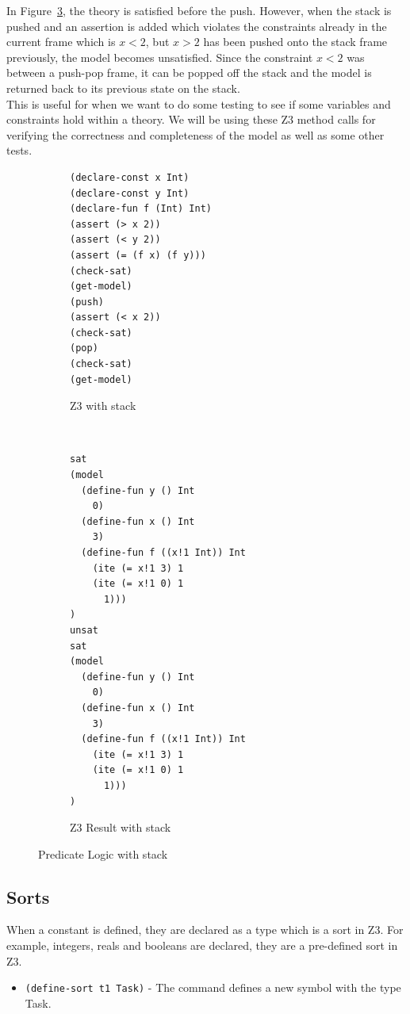 \documentclass[a4paper]{report}
\begin{document}
In Figure~\ref{fig:Predicate Logic with stack}, the theory is satisfied before the push. However, when the stack is pushed and an assertion is added which violates the constraints already in the current frame which is $x < 2$, but $x > 2$ has been pushed onto the stack frame previously, the model becomes unsatisfied. Since the constraint $x < 2$ was between a push-pop frame, it can be popped off the stack and the model is returned back to its previous state on the stack.\\

This is useful for when we want to do some testing to see if some variables and constraints hold within a theory. We will be using these Z3 method calls for verifying the correctness and completeness of the model as well as some other tests.

\begin{figure}[H]
\centering
\begin{subfigure}[b]{\textwidth}
\lstset{numbers=left, showspaces=false,
    showstringspaces=false, tabsize=2, breaklines=true,
    xleftmargin=5.0ex,
}
\lstset{basicstyle=\ttfamily}
\centering
\begin{lstlisting}[frame=single]
(declare-const x Int)
(declare-const y Int)
(declare-fun f (Int) Int)
(assert (> x 2))
(assert (< y 2))
(assert (= (f x) (f y)))
(check-sat)
(get-model)
(push)
(assert (< x 2))
(check-sat)
(pop)
(check-sat)
(get-model)
\end{lstlisting}
\caption{Z3 with stack}
\label{fig:Z3 with stack}
\end{subfigure}\\
\begin{subfigure}[b]{\textwidth}
\lstset{basicstyle=\ttfamily}
\begin{lstlisting}[frame=single]
sat
(model 
  (define-fun y () Int
    0)
  (define-fun x () Int
    3)
  (define-fun f ((x!1 Int)) Int
    (ite (= x!1 3) 1
    (ite (= x!1 0) 1
      1)))
)
unsat
sat
(model 
  (define-fun y () Int
    0)
  (define-fun x () Int
    3)
  (define-fun f ((x!1 Int)) Int
    (ite (= x!1 3) 1
    (ite (= x!1 0) 1
      1)))
)
\end{lstlisting}
\caption{Z3 Result with stack}
\label{fig:Z3 Function stack}
\end{subfigure}
\caption{Predicate Logic with stack}
\label{fig:Predicate Logic with stack}
\end{figure} 

\newpage

\subsection{Sorts}
When a constant is defined, they are declared as a type which is a sort in Z3. For example, integers, reals and booleans are declared, they are a pre-defined sort in Z3. 
\begin{itemize}
\item \texttt{(define-sort t1 Task)} - The command defines a new symbol with the type Task.
\end{itemize}
\end{document}
